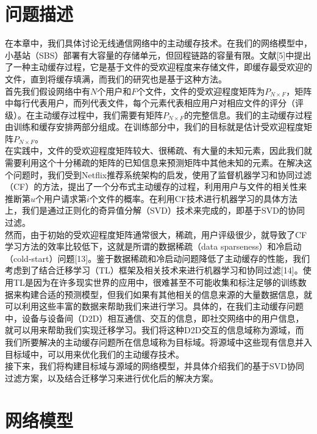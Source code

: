 \documentclass[bachelor]{seuthesis} %
\begin{document}
\begin{Main}
\section{问题描述}
在本章中，我们具体讨论无线通信网络中的主动缓存技术。在我们的网络模型中，小基站（SBS）部署有大容量的存储单元，但回程链路的容量有限。文献[5]中提出了一种主动缓存过程，它是基于文件的受欢迎程度来存储文件，即缓存最受欢迎的文件，直到将缓存填满，而我们的研究也是基于这种方法。\\
首先我们假设网络中有$N$个用户和$F$个文件，文件的受欢迎程度矩阵为$P_{N\times F}$，矩阵中每行代表用户，而列代表文件，每个元素代表相应用户对相应文件的评分（评级）。在主动缓存过程中，我们需要有矩阵$P_{N\times F}$的完整信息。我们的主动缓存过程由训练和缓存安排两部分组成。在训练部分中，我们的目标就是估计受欢迎程度矩阵$P_{N\times F}$。\\
在实践中，文件的受欢迎程度矩阵较大、很稀疏、有大量的未知元素，因此我们就需要利用这个十分稀疏的矩阵的已知信息来预测矩阵中其他未知的元素。在解决这个问题时，我们受到Netflix推荐系统架构的启发，使用了监督机器学习和协同过滤（CF）的方法，提出了一个分布式主动缓存的过程，利用用户与文件的相关性来推断第$u$个用户请求第$i$个文件的概率。在利用CF技术进行机器学习的具体方法上，我们是通过正则化的奇异值分解（SVD）技术来完成的，即基于SVD的协同过滤。\\
然而，由于初始的受欢迎程度矩阵通常很大，稀疏，用户评级很少，就导致了CF学习方法的效率比较低下，这就是所谓的数据稀疏（data sparseness）和冷启动（cold-start）问题[13]。鉴于数据稀疏和冷启动问题降低了主动缓存的性能，我们考虑到了结合迁移学习（TL）框架及相关技术来进行机器学习和协同过滤[14]。使用TL是因为在许多现实世界的应用中，很难甚至不可能收集和标注足够的训练数据来构建合适的预测模型，但我们如果有其他相关的信息来源的大量数据信息，就可以利用这些丰富的数据来帮助我们来进行学习。具体的，在我们主动缓存问题中，设备与设备间（D2D）相互通信、交互的信息，即社交网络中的用户信息，就可以用来帮助我们实现迁移学习。我们将这种D2D交互的信息域称为源域，而我们所要解决的主动缓存问题所在信息域称为目标域。将源域中这些现有信息并入目标域中，可以用来优化我们的主动缓存技术。\\
接下来，我们将构建目标域与源域的网络模型，并具体介绍我们的基于SVD协同过滤方案，以及结合迁移学习来进行优化后的解决方案。
\section{网络模型}

\end{Main}
\end{document}
